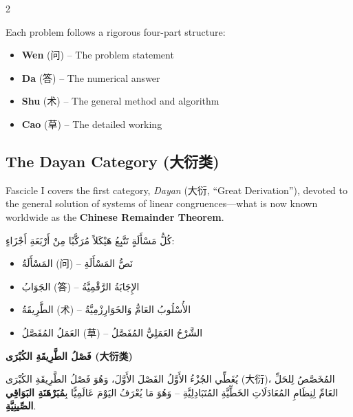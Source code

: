 \documentclass[11pt,a4paper]{article}
\newcommand{\ar}[1]{\arabicfont\beginR #1\endR}
\newcommand{\zhtext}[1]{{\chinese #1}}
\newenvironment{bilingual}{%
  \begin{paracol}{2}
}{%
  \end{paracol}
}
\begin{document}
\begin{bilingual}

\begin{leftcolumn*}
Each problem follows a rigorous four-part structure:

\begin{itemize}
  \item \textbf{Wen} (\zhtext{问}) -- The problem statement
  \item \textbf{Da} (\zhtext{答}) -- The numerical answer
  \item \textbf{Shu} (\zhtext{术}) -- The general method and algorithm
  \item \textbf{Cao} (\zhtext{草}) -- The detailed working
\end{itemize}

\subsection{The Dayan Category (\zhtext{大衍类})}

Fascicle I covers the first category, \textit{Dayan} (\zhtext{大衍}, ``Great Derivation''), devoted to the general solution of systems of linear congruences---what is now known worldwide as the \textbf{Chinese Remainder Theorem}.
\end{leftcolumn*}

\begin{rightcolumn*}
\ar{كُلُّ مَسْأَلَةٍ تَتَّبِعُ هَيْكَلاً مُرَكَّبًا مِنْ أَرْبَعَةِ أَجْزَاءٍ:}

\begin{itemize}
  \item \ar{المَسْأَلَةُ (问) -- نَصُّ المَسْأَلَةِ}
  \item \ar{الجَوَابُ (答) -- الإِجَابَةُ الرَّقْمِيَّةُ}
  \item \ar{الطَّرِيقَةُ (术) -- الأُسْلُوبُ العَامُّ وَالخَوَارِزْمِيَّةُ}
  \item \ar{العَمَلُ المُفَصَّلُ (草) -- الشَّرْحُ العَمَلِيُّ المُفَصَّلُ}
\end{itemize}

\ar{\textbf{فَصْلُ الطَّرِيقَةِ الكُبْرَى (大衍类)}}

\ar{يُغَطِّي الجُزْءُ الأَوَّلُ الفَصْلَ الأَوَّلَ، وَهُوَ فَصْلُ الطَّرِيقَةِ الكُبْرَى (大衍)، المُخَصَّصُ لِلحَلِّ العَامِّ لِنِظَامِ المُعَادَلَاتِ الخَطِّيَّةِ المُتَبَادِلِيَّةِ -- وَهُوَ مَا يُعْرَفُ اليَوْمَ عَالَمِيًّا بِ\textbf{مُبَرْهَنَةِ البَوَاقِي الصِّينِيَّةِ}.}
\end{rightcolumn*}

\end{bilingual}
\end{document}
